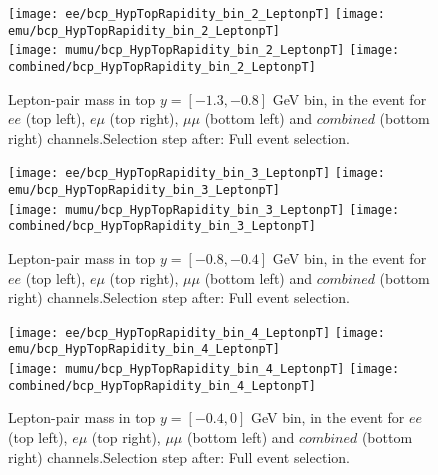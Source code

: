 \documentclass[12pt, a4paper, titlepage]{article}
\begin{document}
\clearpage
\newpage


\begin{figure}
  \texttt{[image: ee/bcp\_HypTopRapidity\_bin\_2\_LeptonpT]}
  \texttt{[image: emu/bcp\_HypTopRapidity\_bin\_2\_LeptonpT]}\\
  \texttt{[image: mumu/bcp\_HypTopRapidity\_bin\_2\_LeptonpT]}
  \texttt{[image: combined/bcp\_HypTopRapidity\_bin\_2\_LeptonpT]}
\caption{Lepton-pair mass in top $y = [-1.3,-0.8]$ GeV bin, in the event for $ee$ (top left), $e\mu$ (top right), $\mu\mu$ (bottom left) and $combined$ (bottom right) channels.\newline Selection step after: Full event selection.}
\end{figure}

\clearpage
\newpage


\begin{figure}
  \texttt{[image: ee/bcp\_HypTopRapidity\_bin\_3\_LeptonpT]}
  \texttt{[image: emu/bcp\_HypTopRapidity\_bin\_3\_LeptonpT]}\\
  \texttt{[image: mumu/bcp\_HypTopRapidity\_bin\_3\_LeptonpT]}
  \texttt{[image: combined/bcp\_HypTopRapidity\_bin\_3\_LeptonpT]}
\caption{Lepton-pair mass in top $y = [-0.8,-0.4]$ GeV bin, in the event for $ee$ (top left), $e\mu$ (top right), $\mu\mu$ (bottom left) and $combined$ (bottom right) channels.\newline Selection step after: Full event selection.}
\end{figure}

\clearpage
\newpage

\begin{figure}
  \texttt{[image: ee/bcp\_HypTopRapidity\_bin\_4\_LeptonpT]}
  \texttt{[image: emu/bcp\_HypTopRapidity\_bin\_4\_LeptonpT]}\\
  \texttt{[image: mumu/bcp\_HypTopRapidity\_bin\_4\_LeptonpT]}
  \texttt{[image: combined/bcp\_HypTopRapidity\_bin\_4\_LeptonpT]}
\caption{Lepton-pair mass in top $y = [-0.4,0]$ GeV bin, in the event for $ee$ (top left), $e\mu$ (top right), $\mu\mu$ (bottom left) and $combined$ (bottom right) channels.\newline Selection step after: Full event selection.}
\end{figure}
\end{document}
